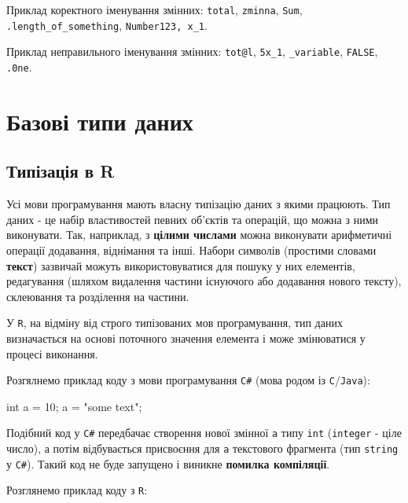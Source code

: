 \documentclass[
]{book}
\newenvironment{Shaded}{\begin{snugshade}}{\end{snugshade}}
\newcommand{\DataTypeTok}[1]{\textcolor[rgb]{0.13,0.29,0.53}{#1}}
\newcommand{\DecValTok}[1]{\textcolor[rgb]{0.00,0.00,0.81}{#1}}
\newcommand{\NormalTok}[1]{#1}
\newcommand{\StringTok}[1]{\textcolor[rgb]{0.31,0.60,0.02}{#1}}
\begin{document}
{Приклад коректного іменування змінних:} \texttt{total}, \texttt{zminna}, \texttt{Sum}, \texttt{.length\_of\_something}, \texttt{Number123,\ x\_1}.

{Приклад неправильного іменування змінних:} \texttt{tot@l}, \texttt{5x\_1}, \texttt{\_variable}, \texttt{FALSE}, \texttt{.0ne}.

\hypertarget{chapter22}{%
\section{Базові типи даних}\label{chapter22}}

\hypertarget{chapter221}{%
\subsection{Типізація в R}\label{chapter221}}

Усі мови програмування мають власну типізацію даних з якими працюють. Тип даних - це набір властивостей певних об'єктів та операцій, що можна з ними виконувати. Так, наприклад, з \textbf{цілими числами} можна виконувати арифметичні операції додавання, віднімання та інші. Набори символів (простими словами \textbf{текст}) зазвичай можуть використовуватися для пошуку у них елементів, редагування (шляхом видалення частини існуючого або додавання нового тексту), склеювання та розділення на частини.

У \texttt{R}, на відміну від строго типізованих мов програмування, тип даних визначається на основі поточного значення елемента і може змінюватися у процесі виконання.

Розгялнемо приклад коду з мови програмування \texttt{C\#} (мова родом із \texttt{C}/\texttt{Java}):

\begin{Shaded}
\begin{Highlighting}[]
\DataTypeTok{int}\NormalTok{ a = }\DecValTok{10}\NormalTok{;}
\NormalTok{a = }\StringTok{"some text"}\NormalTok{;}
\end{Highlighting}
\end{Shaded}

Подібний код у \texttt{C\#} передбачає створення нової змінної \texttt{a} типу \texttt{int} (\texttt{integer} - ціле число), а потім відбувається присвоєння для \texttt{a} текстового фрагмента (тип \texttt{string} у \texttt{С\#}). Такий код не буде запущено і виникне {\textbf{помилка компіляції}}.

Розглянемо приклад коду з \texttt{R}:
\end{document}
